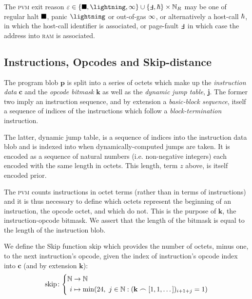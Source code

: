 The \textsc{pvm} exit reason $\varepsilon \in \{\halt, \panic, \oog\} \cup \{\fault, \host\} \times \N_R$ may be one of regular halt $\blacksquare$, panic $\panic$ or out-of-gas $\infty$, or alternatively a host-call $\hbar$, in which the host-call identifier is associated, or page-fault $\fault$ in which case the address into \textsc{ram} is associated.

\subsection{Instructions, Opcodes and Skip-distance}

The program blob $\mathbf{p}$ is split into a series of octets which make up the \emph{instruction data} $\mathbf{c}$ and the \emph{opcode bitmask} $\mathbf{k}$ as well as the \emph{dynamic jump table}, $\mathbf{j}$. The former two imply an instruction sequence, and by extension a \emph{basic-block sequence}, itself a sequence of indices of the instructions which follow a \emph{block-termination} instruction.

The latter, dynamic jump table, is a sequence of indices into the instruction data blob and is indexed into when dynamically-computed jumps are taken. It is encoded as a sequence of natural numbers (i.e. non-negative integers) each encoded with the same length in octets. This length, term $z$ above, is itself encoded prior.

The \textsc{pvm} counts instructions in octet terms (rather than in terms of instructions) and it is thus necessary to define which octets represent the beginning of an instruction, \ie the opcode octet, and which do not. This is the purpose of $\mathbf{k}$, the instruction-opcode bitmask. We assert that the length of the bitmask is equal to the length of the instruction blob.

\newcommand{\Fskip}{\text{skip}}

We define the Skip function $\Fskip$ which provides the number of octets, minus one, to the next instruction's opcode, given the index of instruction's opcode index into $\mathbf{c}$ (and by extension $\mathbf{k}$):
\begin{equation}
  \Fskip\colon\left\{\begin{aligned}
    \N &\to \N\\
    i &\mapsto \min(24,\ j \in \N : (\mathbf{k} \frown [1, 1, \dots])_{i + 1 + j} = 1)
  \end{aligned}\right.
\end{equation}

